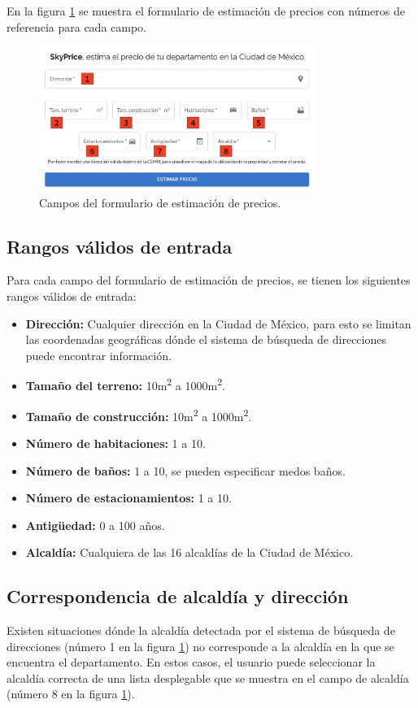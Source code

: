 En la figura \ref{fig:formulario} se muestra el formulario de estimación de precios
con números de referencia para cada campo.

\begin{figure}[H]
    \centering
    \includegraphics[width=0.8\textwidth]{imagenes/03-estimacion-precios/campos-formulario.png}
    \caption{Campos del formulario de estimación de precios.}
    \label{fig:formulario}
\end{figure}

\subsection{Rangos válidos de entrada}
Para cada campo del formulario de estimación de precios, se tienen los siguientes
rangos válidos de entrada:

\begin{itemize}
    \item \textbf{Dirección:} Cualquier dirección en la Ciudad de México, para esto
    se limitan las coordenadas geográficas dónde el sistema de búsqueda de direcciones
    puede encontrar información.
    \item \textbf{Tamaño del terreno:} 10m\textsuperscript{2} a 1000m\textsuperscript{2}.
    \item \textbf{Tamaño de construcción:} 10m\textsuperscript{2} a 1000m\textsuperscript{2}.
    \item \textbf{Número de habitaciones:} 1 a 10.
    \item \textbf{Número de baños:} 1 a 10, se pueden especificar medos baños.
    \item \textbf{Número de estacionamientos:} 1 a 10.
    \item \textbf{Antigüedad:} 0 a 100 años.
    \item \textbf{Alcaldía:} Cualquiera de las 16 alcaldías de la Ciudad de México.
\end{itemize}

\subsection{Correspondencia de alcaldía y dirección}
Existen situaciones dónde la alcaldía detectada por el sistema de búsqueda de
direcciones (número 1 en la figura \ref{fig:formulario}) no corresponde a la alcaldía en la que se encuentra el departamento.
En estos casos, el usuario puede seleccionar la alcaldía correcta de una lista
desplegable que se muestra en el campo de alcaldía (número 8 en la figura \ref{fig:formulario}).

